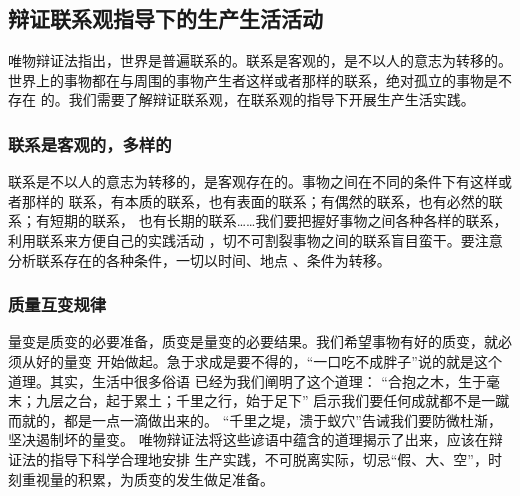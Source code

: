 \documentclass{article}
\begin{document}
    \subsection{辩证联系观指导下的生产生活活动}
    唯物辩证法指出，世界是普遍联系的。联系是客观的，是不以人的意志为转移的。
    世界上的事物都在与周围的事物产生者这样或者那样的联系，绝对孤立的事物是不存在
    的。我们需要了解辩证联系观，在联系观的指导下开展生产生活实践。
        \subsubsection{联系是客观的，多样的}
        联系是不以人的意志为转移的，是客观存在的。事物之间在不同的条件下有这样或者那样的
        联系，有本质的联系，也有表面的联系；有偶然的联系，也有必然的联系；有短期的联系，
        也有长期的联系……我们要把握好事物之间各种各样的联系，利用联系来方便自己的实践活动
        ，切不可割裂事物之间的联系盲目蛮干。要注意分析联系存在的各种条件，一切以时间、地点
        、条件为转移。
        \subsubsection{质量互变规律}
        量变是质变的必要准备，质变是量变的必要结果。我们希望事物有好的质变，就必须从好的量变
        开始做起。急于求成是要不得的，“一口吃不成胖子”说的就是这个道理。其实，生活中很多俗语
        已经为我们阐明了这个道理：
        “合抱之木，生于毫末；九层之台，起于累土；千里之行，始于足下”
        启示我们要任何成就都不是一蹴而就的，都是一点一滴做出来的。
        “千里之堤，溃于蚁穴”告诫我们要防微杜渐，坚决遏制坏的量变。
        唯物辩证法将这些谚语中蕴含的道理揭示了出来，应该在辩证法的指导下科学合理地安排
        生产实践，不可脱离实际，切忌“假、大、空”，时刻重视量的积累，为质变的发生做足准备。
        \newpage
        
               
      
\end{document}

